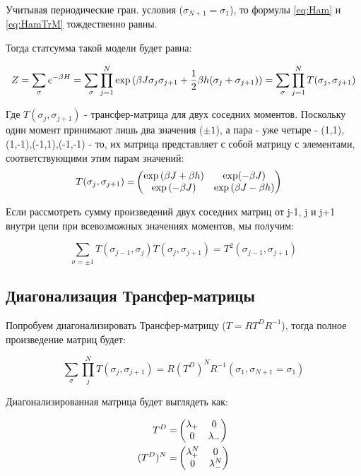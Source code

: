 Учитывая периодические гран. условия ($\sigma_{N+1} = \sigma_{1}$), то формулы \eqref{eq:Ham} и \eqref{eq:HamTrM} тождественно равны.

Тогда статсумма такой модели будет равна:

\begin{equation}\label{ZTrM}
    Z = \sum_{\sigma} e^{-\beta H} = \sum_{\sigma} \prod_{j=1}^{N} \exp{(\beta J\sigma_{j}\sigma_{j+1} + \frac{1}{2}\beta h(\sigma_{j} + \sigma_{j+1}))} = \sum_{\sigma} \prod_{j=1}^{N} T(\sigma_{j}, \sigma_{j+1})
\end{equation}
    
Где $T(\sigma_{j}, \sigma_{j+1})$ - трансфер-матрица для двух соседних моментов. Поскольку один момент принимают лишь два значения ($\pm1$), а пара - уже четыре - (1,1),(1,-1),(-1,1),(-1,-1) - то, их матрица представляет с собой матрицу с элементами, соответствующими этим парам значений:
\begin{align}\label{TrM}
  T(\sigma_{j}, \sigma_{j+1}) = &
  \begin{pmatrix}
    \exp{(\beta J+\beta h)} & \exp(-\beta J) \\
    \exp{(-\beta J)} & \exp{(\beta J-\beta h)}
  \end{pmatrix}  
\end{align}

Если рассмотреть сумму произведений двух соседних матриц от j-1, j и j+1 внутри цепи при всевозможных значениях моментов, мы получим:

\[\sum_{\sigma = \pm 1} T(\sigma_{j-1}, \sigma_{j})T(\sigma_{j}, \sigma_{j+1}) = T^{2}(\sigma_{j-1}, \sigma_{j+1})\]

\subsection{Диагонализация Трансфер-матрицы}

Попробуем диагонализировать Трансфер-матрицу ($ T = R T^{D} R^{-1} $), тогда полное произведение матриц будет:

\[ \sum_{\sigma}\prod_{j}^{N} T(\sigma_{j}, \sigma_{j+1}) = R (T^{D})^{N} R^{-1} (\sigma_{1},\sigma_{N+1} = \sigma_{1})\]

Диагонализированная матрица будет выглядеть как:

\begin{align}
T^{D} = &
\begin{pmatrix}\label{Td}
  \lambda_{+} & 0 \\
  0 & \lambda_{-}
\end{pmatrix} \\ 
(T^{D})^{N} = &
\begin{pmatrix}
  \lambda_{+}^{N} & 0 \\
  0 & \lambda_{-}^{N}
\end{pmatrix}
\end{align}

